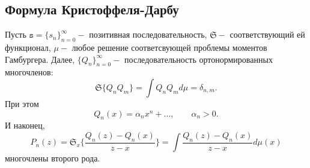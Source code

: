\documentclass[12 pt, a4 paper]{article}
\theoremstyle{plain}   \newtheorem{Pro}{Задача}
\begin{document}
\subsection{Формула Кристоффеля-Дарбу}
$ \; $
\\
Пусть
$ \mathtt{s}=\{ s_n \} _{n=0}^{\infty} - $
позитивная последовательность,
$ \mathfrak{S} - $
соответствующий ей функционал,
$ \mu - $
любое решение соответсвующей проблемы моментов Гамбургера.
Далее,
$ \{ Q_n \} _{n=0}^{\infty} - $
последовательность ортонормированных многочленов:
$$
  \mathfrak{S} \{ Q_n Q_m \} = \int Q_n Q_m d\mu =
  \delta _{n,m}.
$$
При этом
$$
  Q_n (x) = \alpha _n x^n +...,
  \qquad \alpha _n >0.
$$
И наконец,
$$
  P_n (z)=\mathfrak{S}_x  \Biggl \{
  \frac{Q_n (z)-Q_n (x)}{z-x} \Biggr \} =
  \int \frac{Q_n (z)-Q_n (x) }{z-x}d\mu (x)
$$
многочлены второго рода.
\\
\end{document}
